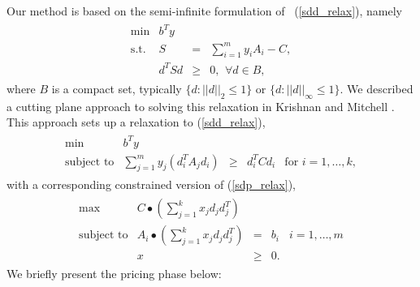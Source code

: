 \documentclass[12pt]{article}
\begin{document}
Our method is based on the semi-infinite formulation of
~(\ref{sdd_relax}), namely
\begin{eqnarray}
\begin{array}{lrcc}
\min & b^Ty \\
\mbox{s.t.} & S & = & \displaystyle \sum_{i=1}^my_iA_i - C, \\
& d^TSd & \geq & 0, \,\ \forall d \in B,
\end{array}
\end{eqnarray}
where $B$ is a compact set, typically $\{d : ||d||_2 \le 1\}$ or
$\{d : ||d||_{\infty} \le 1\}$. We described a cutting plane
approach to solving this relaxation in Krishnan and Mitchell
\cite{kartik3,kartik2,kartik4,kartik5}. This approach sets up a
relaxation to (\ref{sdd_relax}),
\begin{eqnarray}
\label{lp_relax_sdd}
\begin{array}{lccclr}
\min & b^Ty \\
\mbox{subject to} &  \displaystyle \sum_{j=1}^my_j(d_i^TA_jd_i) &
\geq & d_i^TCd_i &
     \mbox{for } i=1,\ldots,k,
\end{array}
\end{eqnarray}
with a corresponding constrained version of (\ref{sdp_relax}),
\begin{eqnarray}
\label{lp_relax_sdp}
\begin{array}{lrclr}
\max & C \bullet (\displaystyle \sum_{j=1}^k x_j d_j d_j^T)  \\
\mbox{subject to} & A_i \bullet (\displaystyle \sum_{j=1}^k x_j d_j d_j^T) & = & b_i & i=1,\ldots,m  \\
& x & \geq & 0.
\end{array}
\end{eqnarray}
We briefly present the pricing phase below:
\end{document}
